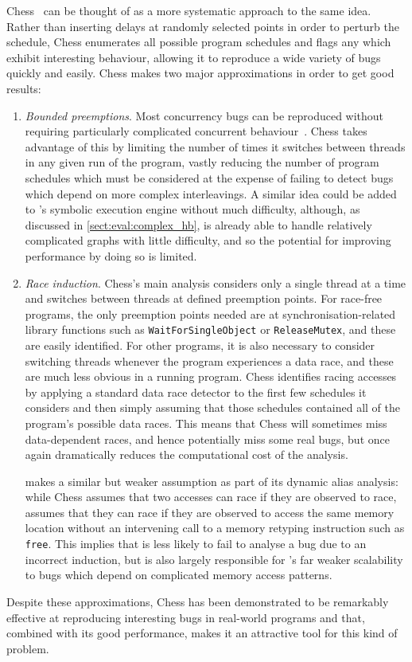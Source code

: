 Chess~\cite{Musuvathi2008} can be thought of as a more systematic
approach to the same idea.  Rather than inserting delays at randomly
selected points in order to perturb the schedule, Chess enumerates all
possible program schedules and flags any which exhibit interesting
behaviour, allowing it to reproduce a wide variety of bugs quickly and
easily.  Chess makes two major approximations in order to get good
results:
\begin{enumerate}
\item \emph{Bounded preemptions}. Most concurrency bugs can be
  reproduced without requiring particularly complicated concurrent
  behaviour~\cite{Musuvathi2007}.  Chess takes advantage of this by
  limiting the number of times it switches between threads in any
  given run of the program, vastly reducing the number of program
  schedules which must be considered at the expense of failing to
  detect bugs which depend on more complex interleavings.  A similar
  idea could be added to {\technique}'s symbolic execution engine
  without much difficulty, although, as discussed in
  \autoref{sect:eval:complex_hb}, {\technique} is already able to
  handle relatively complicated graphs with little difficulty, and so
  the potential for improving performance by doing so is limited.
\item \emph{Race induction}. Chess's main analysis considers only a
  single thread at a time and switches between threads at defined
  preemption points.  For race-free programs, the only preemption
  points needed are at synchronisation-related library functions such
  as \texttt{WaitForSingleObject} or \texttt{ReleaseMutex}, and these
  are easily identified.  For other programs, it is also necessary to
  consider switching threads whenever the program experiences a data
  race, and these are much less obvious in a running program.  Chess
  identifies racing accesses by applying a standard data race detector
  to the first few schedules it considers and then simply assuming
  that those schedules contained all of the program's possible data
  races.  This means that Chess will sometimes miss data-dependent
  races, and hence potentially miss some real bugs, but once again
  dramatically reduces the computational cost of the analysis.

  {\Technique} makes a similar but weaker assumption as part of its
  dynamic alias analysis: while Chess assumes that two accesses can
  race if they are observed to race, {\technique} assumes that they
  can race if they are observed to access the same memory location
  without an intervening call to a memory retyping instruction such as
  \texttt{free}.  This implies that {\technique} is less likely to
  fail to analyse a bug due to an incorrect induction, but is also
  largely responsible for {\technique}'s far weaker scalability to
  bugs which depend on complicated memory access patterns.
\end{enumerate}
Despite these approximations, Chess has been demonstrated to be
remarkably effective at reproducing interesting bugs in real-world
programs and that, combined with its good performance, makes it an
attractive tool for this kind of problem.

